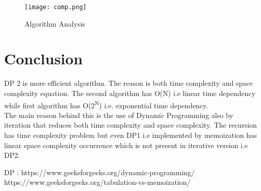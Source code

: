\documentclass[conference]{IEEEtran}
\begin{document}
\begin{figure}[h!]
\centerline{\texttt{[image: comp.png]}}
\caption{Algorithm Analysis}
\centerline{\textit{ }}
\label{fig:graph}
\end{figure}

\newpage

\section{Conclusion}
DP 2 is more efficient algorithm. The reason is both time complexity and space complexity equation.
The second algorithm has O(N) i.e linear time dependency while first algorithm has O(2\textsuperscript{N}) i.e. exponential time dependency. \\
The main reason behind this is the use of Dynamic Programming also by iteration that reduces both time complexity and space complexity. The recursion has time complexity problem but even DP1 i.e implemented by memoization has linear space complexity occurrence which is not present in iterative version i.e DP2.

\begin{thebibliography}{00}
DP : https://www.geeksforgeeks.org/dynamic-programming/
https://www.geeksforgeeks.org/tabulation-vs-memoization/
\end{thebibliography}
\end{document}
